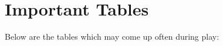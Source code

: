 \appendix
\chapter{Important Tables}
\label{ap:important-tables}
\label{critical-hits}
Below are the tables which may come up often during play:


